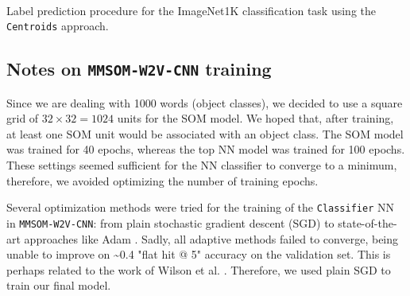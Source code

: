 \documentclass[a4paper]{standalone}
\begin{document}
\begin{algorithm}[ht]
    \\
    \caption{Label prediction procedure for the ImageNet1K classification task using the \texttt{Centroids} approach.}\label{alg:RetrieveCentroidLabel}
\end{algorithm}

\subsection{Notes on \texttt{MMSOM-W2V-CNN} training}

Since we are dealing with 1000 words (object classes), we decided to use a square grid of $32\times 32 = 1024$ units for the SOM model. We hoped that, after training, at least one SOM unit would be associated with an object class. The SOM model was trained for 40 epochs, whereas the top NN model was trained for 100 epochs. These settings seemed sufficient for the NN classifier to converge to a minimum, therefore, we avoided optimizing the number of training epochs.

Several optimization methods were tried for the training of the \verb|Classifier| NN in \verb|MMSOM-W2V-CNN|: from plain stochastic gradient descent (SGD) to state-of-the-art approaches like Adam \cite{kingma2014adam}. Sadly, all adaptive methods failed to converge, being unable to improve on \textasciitilde 0.4 "flat hit @ 5" accuracy on the validation set. This is perhaps related to the work of Wilson et al. \cite{Wilson2017}. Therefore, we used plain SGD to train our final model.
\end{document}
